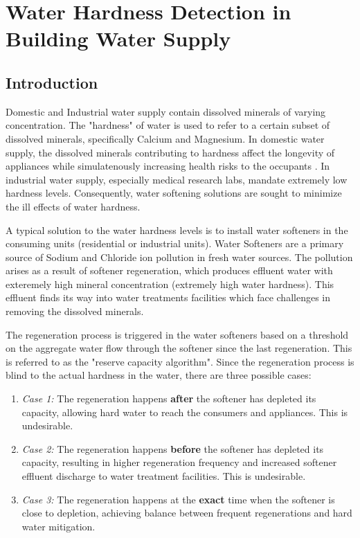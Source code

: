 \chapter{Water Hardness Detection in Building Water Supply}
\label{chap:water}

\section{Introduction}

Domestic and Industrial water supply contain dissolved minerals of varying concentration.
 The "hardness" of water \cite{WhatIsWaterHardness} is used to refer to a certain subset of dissolved minerals, specifically Calcium and Magnesium.
 In domestic water supply, the dissolved minerals contributing to hardness affect the longevity of appliances \cite{SoftenedWaterBenefitsStudy} while simulatenously increasing health risks to the occupants \cite{PotentialHealthImpactsOfHardWater} \cite{WaterHardnessOnCardiovascularDisease}.
 In industrial water supply, especially medical research labs, mandate extremely low hardness levels.
 Consequently, water softening solutions are sought to minimize the ill effects of water hardness.

A typical solution to the water hardness levels is to install water softeners in the consuming units (residential or industrial units).
 Water Softeners are a primary source of Sodium and Chloride ion pollution in fresh water sources.
 The pollution arises as a result of softener regeneration, which produces effluent water with exteremely high mineral concentration (extremely high water hardness).
 This effluent finds its way into water treatments facilities which face challenges in removing the dissolved minerals.

The regeneration process is triggered in the water softeners based on a threshold on the aggregate water flow through the softener since the last regeneration.
 This is referred to as the "reserve capacity algorithm".
 Since the regeneration process is blind to the actual hardness in the water, there are three possible cases:

\begin{enumerate}
\item \emph{Case 1:} The regeneration happens \textbf{after} the softener has depleted its capacity, allowing hard water to reach the consumers and appliances.
 This is undesirable.
\item \emph{Case 2:} The regeneration happens \textbf{before} the softener has depleted its capacity, resulting in higher regeneration frequency and increased softener effluent discharge to water treatment facilities.
 This is undesirable.
\item \emph{Case 3:} The regeneration happens at the \textbf{exact} time when the softener is close to depletion, achieving balance between frequent regenerations and hard water mitigation.
\end{enumerate}

